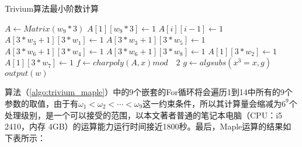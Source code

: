 \begin{breakablealgorithm}[H]
  \caption{Trivium算法最小阶数计算}
  \label{algo:trivium_maple}
  \begin{algorithmic}
    
                      \STATE $A \leftarrow Matrix(w_{9}*3)$
                      \STATE $A[1][w_{9}*3] \leftarrow 1$
                        \STATE $A[i][i - 1] \leftarrow 1$
                      \ENDFOR 
                      \STATE $A[3*w_{3}+1][3*w_{1}] \leftarrow 1$
                      \STATE $A[3*w_{3}+1][3*w_{5}] \leftarrow 1$
                      \STATE $A[3*w_{6}+1][3*w_{4}] \leftarrow 1$
                      \STATE $A[3*w_{6}+1][3*w_{8}] \leftarrow 1$
                      \STATE $A[1][3*w_{2}] \leftarrow 1$
                      \STATE $A[1][3*w_{7}] \leftarrow 1$
                      \STATE $f \leftarrow charpoly(A, x) mod \quad 2$
                        \STATE $g \leftarrow algsubs(x^{3}=x, g)$
                          \STATE $output(w)$
                        \ENDIF
                      \ENDIF
                    \ENDFOR
                  \ENDFOR
                \ENDFOR
              \ENDFOR
            \ENDFOR
          \ENDFOR
        \ENDFOR
      \ENDFOR
    \ENDFOR
    
  \end{algorithmic}
\end{breakablealgorithm}

算法（\ref{algo:trivium_maple}）中的9个嵌套的For循环将会遍历1到14中所有的9个参数的取值，由于有$\omega_{1}<\omega_{2}<\cdots<\omega_{9}$这一约束条件，所以其计算量会缩减为$6^9$个处理级别，是一个可以接受的范围，以本文著者普通的笔记本电脑（CPU：i5 2410，内存 4GB）的运算能力运行时间接近1800秒。最后，Maple运算的结果如下表所示：

